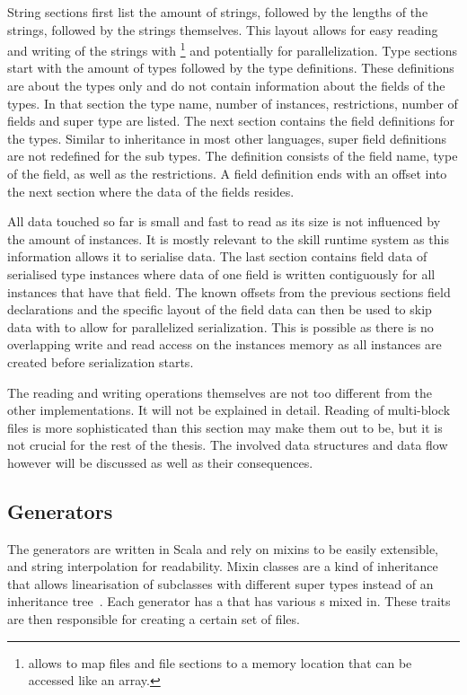\documentclass[thesis]{subfiles}
\begin{document}
    String sections first list the amount of strings, followed by the lengths of the strings, followed by the strings themselves.
    This layout allows for easy reading and writing of the strings with \footnote{
       allows to map files and file sections to a memory location that can be accessed like an array.
    } and potentially for parallelization.
    Type sections start with the amount of types followed by the type definitions.
    These definitions are about the types only and do not contain information about the fields of the types.
    In that section the type name, number of instances, restrictions, number of fields and super type are listed.
    The next section contains the field definitions for the types.
    Similar to inheritance in most other languages, super field definitions are not redefined for the sub types.
    The definition consists of the field name, type of the field, as well as the restrictions.
    A field definition ends with an offset into the next section where the data of the fields resides.%
    ~\autocite{skill-tr}

    All data touched so far is small and fast to read as its size is not influenced by the amount of instances.
    It is mostly relevant to the \gls{skill} runtime system as this information allows it to serialise data.
    The last section contains field data of serialised type instances where data of one field is written contiguously for all instances that have that field.
    The known offsets from the previous sections field declarations and the specific layout of the field data can then be used to skip data with  to allow for parallelized serialization.
    This is possible as there is no overlapping write and read access on the instances memory as all instances are created before serialization starts.%
    ~\autocite{skill-tr}

    The reading and writing  operations themselves are not too different from the other implementations.
    It will not be explained in detail.
    Reading of multi-block files is more sophisticated than this section may make them out to be, but it is not crucial for the rest of the thesis.
    The involved data structures and data flow however will be discussed as well as their consequences.

  \subsection{Generators}
    The generators are written in Scala and rely on mixins to be easily extensible, and string interpolation for readability.
    Mixin classes are a kind of inheritance that allows linearisation of subclasses with different super types instead of an inheritance tree~\autocite[117f.]{oop-inter}.
    Each generator has a   that has various s mixed in.
    These traits are then responsible for creating a certain set of files.
\end{document}
